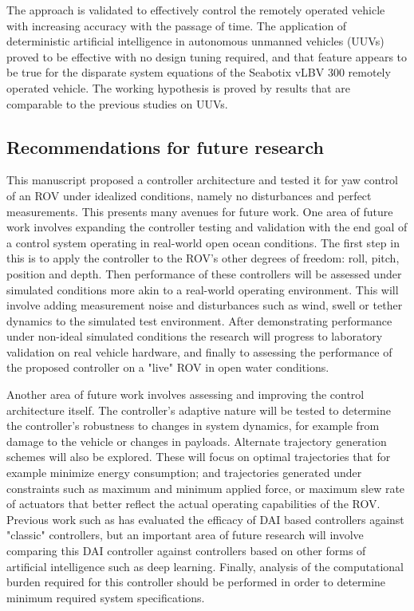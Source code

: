 \documentclass[applsci,article,submit,pdftex,moreauthors]{Definitions/mdpi}
\begin{document}
\begin{paracol}{2}
The approach is validated to effectively control the remotely operated vehicle with increasing accuracy with the passage of time. The application of deterministic artificial intelligence in autonomous unmanned vehicles (UUVs) proved to be effective with no design tuning required, and that feature appears to be true for the disparate system equations of the Seabotix vLBV 300 remotely operated vehicle. The working hypothesis is proved by results that are comparable to the previous studies on UUVs. 

\subsection{Recommendations for future research}
This manuscript proposed a controller architecture and tested it for yaw control of an ROV under idealized conditions, namely no disturbances and perfect measurements. This presents many avenues for future work. One area of future work involves expanding the controller testing and validation with the end goal of a control system operating in real-world open ocean conditions. The first step in this is to apply the controller to the ROV's other degrees of freedom: roll, pitch, position and depth. Then performance of these controllers will be assessed under simulated conditions more akin to a real-world operating environment. This will involve adding measurement noise and disturbances such as wind, swell or tether dynamics to the simulated test environment. After demonstrating performance under non-ideal simulated conditions the research will progress to laboratory validation on real vehicle hardware, and finally to assessing the performance of the proposed controller on a "live" ROV in open water conditions. 

Another area of future work involves assessing and improving the control architecture itself. The controller's adaptive nature will be tested to determine the controller's robustness to changes in system dynamics, for example from damage to the vehicle or changes in payloads. Alternate trajectory generation schemes will also be explored. These will focus on optimal trajectories that for example minimize energy consumption; and trajectories generated under constraints such as maximum and minimum applied force, or maximum slew rate of actuators that better reflect the actual operating capabilities of the ROV. Previous work such as \cite{Smeresky20} has evaluated the efficacy of DAI based controllers against "classic" controllers, but an important area of future research will involve comparing this DAI controller against controllers based on other forms of artificial intelligence such as deep learning. Finally, analysis of the computational burden required for this controller should be performed in order to determine minimum required system specifications.


\end{paracol}
\end{document}
